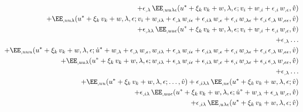 \begin{equation}
\begin{aligned}[b]
    + \epsilon_{,\lambda} \, \EE_{,uu\lambda\epsilon}(u^\ast + \xi_k \, v_k + w, \lambda, \epsilon; v_i + w_{,i} + \epsilon_{,i} \, w_{,\epsilon}, \hat{v}) &\\
    + \EE_{,uu\lambda}(u^\ast + \xi_k \, v_k + w, \lambda, \epsilon; v_i + w_{,i\lambda} + \epsilon_{,\lambda} \, w_{,i\epsilon} + \epsilon_{,i\lambda} \, w_{,\epsilon} + \epsilon_{,i} \, w_{,\lambda\epsilon}  + \epsilon_{,i} \, \epsilon_{,\lambda} \, w_{,\epsilon\epsilon}, \hat{v}) &\\
    + \epsilon_{,\lambda\lambda} \, \EE_{,uu\epsilon}(u^\ast + \xi_k \, v_k + w, \lambda, \epsilon; v_i + w_{,i} + \epsilon_{,i} \, w_{,\epsilon}, \hat{v}) &\\
    + \epsilon_{,\lambda} \ldots &\\
    + \EE_{,uuu}(u^\ast + \xi_k \, v_k + w, \lambda, \epsilon; \dot{u}^\ast + w_{,\lambda} + \epsilon_{,\lambda} \, w_{,\epsilon}, w_{,i\lambda} + \epsilon_{,\lambda} \, w_{,i\epsilon} + \epsilon_{,i\lambda} \, w_{,\epsilon} + \epsilon_{,i} \, w_{,\lambda\epsilon} + \epsilon_{,i} \, \epsilon_{,\lambda} \, w_{,\epsilon\epsilon}, \hat{v}) &\\
    + \EE_{,uu\lambda}(u^\ast + \xi_k \, v_k + w, \lambda, \epsilon; w_{,i\lambda} + \epsilon_{,\lambda} \, w_{,i\epsilon} + \epsilon_{,i\lambda} \, w_{,\epsilon} + \epsilon_{,i} \, w_{,\lambda\epsilon} + \epsilon_{,i} \, \epsilon_{,\lambda} \, w_{,\epsilon\epsilon}, \hat{v}) &\\
    + \epsilon_{,\lambda} \ldots &\\
    + \EE_{,uu}(u^\ast + \xi_k \, v_k + w, \lambda, \epsilon;\ldots, \hat{v})
    + \epsilon_{,i\lambda\lambda} \, \EE_{,u\epsilon}(u^\ast + \xi_k \, v_k + w, \lambda, \epsilon; \hat{v}) &\\
    + \epsilon_{,i\lambda} \, \EE_{,uu\epsilon}(u^\ast + \xi_k \, v_k + w, \lambda, \epsilon; \dot{u}^\ast + w_{,\lambda} + \epsilon_{,\lambda} \, w_{,\epsilon}, \hat{v}) &\\
    + \epsilon_{,i\lambda} \, \EE_{,u\lambda\epsilon}(u^\ast + \xi_k \, v_k + w, \lambda, \epsilon; \hat{v}) &\\

\end{aligned}
\end{equation}
